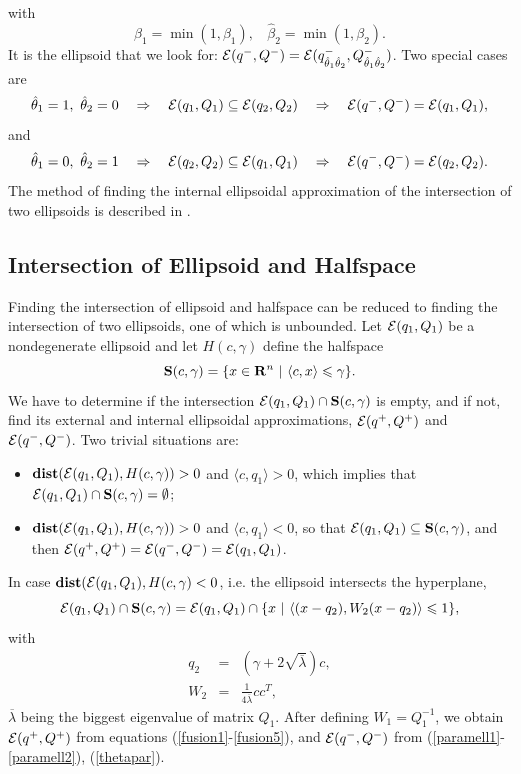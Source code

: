 \documentclass{report}
\newcommand{\EE}{{\cal E}}
\begin{document}
with
\[ \hat{\beta}_1=\min(1,\beta_1), ~~~~ \hat{\beta}_2=\min(1,\beta_2). \]
It is the ellipsoid that we look for:
$\EE(q^-,Q^-)=\EE(q^-_{\hat{\theta}_1\hat{\theta}_2},Q^-_{\hat{\theta}_1\hat{\theta}_2})$.
Two special cases are
\[ \hat{\theta}_1=1, ~ \hat{\theta}_2=0 ~~~ \Rightarrow ~~~
\EE(q_1,Q_1)\subseteq\EE(q_2,Q_2) ~~~ \Rightarrow ~~~
\EE(q^-,Q^-)=\EE(q_1,Q_1), \]
and
\[ \hat{\theta}_1=0, ~ \hat{\theta}_2=1 ~~~ \Rightarrow ~~~
\EE(q_2,Q_2)\subseteq\EE(q_1,Q_1) ~~~ \Rightarrow ~~~
\EE(q^-,Q^-)=\EE(q_2,Q_2). \]
The method of finding the internal ellipsoidal approximation of the
intersection of two ellipsoids is described in \cite{vazhen}.


\subsection{Intersection of Ellipsoid and Halfspace}
Finding the intersection of ellipsoid and halfspace can be reduced to
finding the intersection of two ellipsoids, one of which is unbounded.
Let $\EE(q_1,Q_1)$ be a nondegenerate ellipsoid and let  $H(c,\gamma)$
define the halfspace
\[ {\bf S}(c,\gamma) = \{x\in{\bf R}^n ~|~ \langle c,x\rangle\leq\gamma\}. \]
We have to determine if the intersection $\EE(q_1,Q_1)\cap{\bf S}(c,\gamma)$
is empty, and if not, find its external and internal ellipsoidal approximations,
$\EE(q^+,Q^+)$ and $\EE(q^-,Q^-)$.
Two trivial situations are:
\begin{itemize}
\item ${\bf dist}(\EE(q_1,Q_1),H(c,\gamma))>0$ and $\langle c, q_1\rangle>0$,
which implies that $\EE(q_1,Q_1)\cap{\bf S}(c,\gamma)=\emptyset$;
\item ${\bf dist}(\EE(q_1,Q_1),H(c,\gamma))>0$ and $\langle c, q_1\rangle<0$,
so that $\EE(q_1,Q_1)\subseteq{\bf S}(c,\gamma)$, and then
$\EE(q^+,Q^+)=\EE(q^-,Q^-)=\EE(q_1,Q_1)$.
\end{itemize}
In case ${\bf dist}(\EE(q_1,Q_1),H(c,\gamma)<0$, i.e. the ellipsoid
intersects the hyperplane,
\[ \EE(q_1,Q_1)\cap{\bf S}(c,\gamma) =
\EE(q_1,Q_1)\cap\{x ~|~ \langle (x-q_2),W_2(x-q_2)\rangle\leq1\}, \]
with
\begin{eqnarray}
q_2 & = & (\gamma + 2\sqrt{\overline{\lambda}})c,\label{hsell1} \\
W_2 & = & \frac{1}{4\overline{\lambda}}cc^T,\label{hsell2}
\end{eqnarray}
 $\overline{\lambda}$ being the biggest eigenvalue of matrix $Q_1$.
After defining $W_1=Q_1^{-1}$, we obtain $\EE(q^+,Q^+)$ from  equations
(\ref{fusion1}-\ref{fusion5}), and $\EE(q^-,Q^-)$ from
(\ref{paramell1}-\ref{paramell2}), (\ref{thetapar}).
\end{document}
